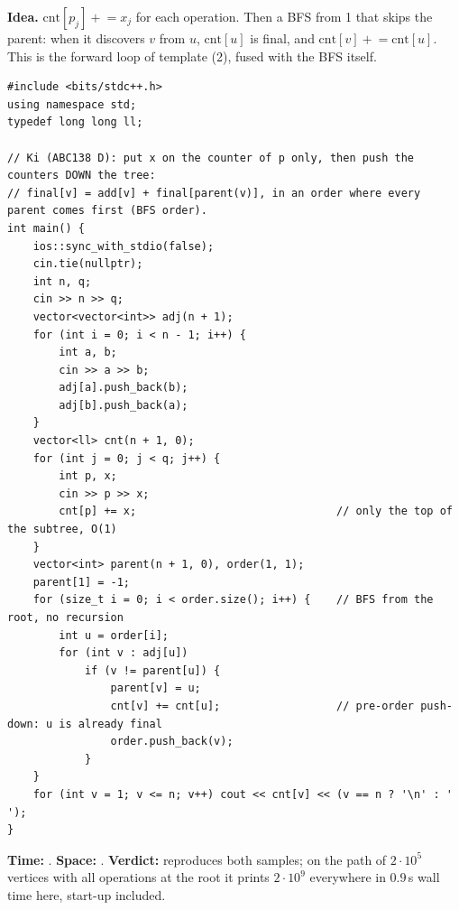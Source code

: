 \begin{algorithmbox}
\textbf{Idea.} $\mathrm{cnt}[p_j] \mathrel{+}= x_j$ for each operation. Then a BFS from 1 that skips the parent: when it discovers $v$ from $u$, $\mathrm{cnt}[u]$ is final, and $\mathrm{cnt}[v] \mathrel{+}= \mathrm{cnt}[u]$. This is the forward loop of template (2), fused with the BFS itself.

\begin{lstlisting}[style=cpp]
#include <bits/stdc++.h>
using namespace std;
typedef long long ll;

// Ki (ABC138 D): put x on the counter of p only, then push the counters DOWN the tree:
// final[v] = add[v] + final[parent(v)], in an order where every parent comes first (BFS order).
int main() {
    ios::sync_with_stdio(false);
    cin.tie(nullptr);
    int n, q;
    cin >> n >> q;
    vector<vector<int>> adj(n + 1);
    for (int i = 0; i < n - 1; i++) {
        int a, b;
        cin >> a >> b;
        adj[a].push_back(b);
        adj[b].push_back(a);
    }
    vector<ll> cnt(n + 1, 0);
    for (int j = 0; j < q; j++) {
        int p, x;
        cin >> p >> x;
        cnt[p] += x;                               // only the top of the subtree, O(1)
    }
    vector<int> parent(n + 1, 0), order(1, 1);
    parent[1] = -1;
    for (size_t i = 0; i < order.size(); i++) {    // BFS from the root, no recursion
        int u = order[i];
        for (int v : adj[u])
            if (v != parent[u]) {
                parent[v] = u;
                cnt[v] += cnt[u];                  // pre-order push-down: u is already final
                order.push_back(v);
            }
    }
    for (int v = 1; v <= n; v++) cout << cnt[v] << (v == n ? '\n' : ' ');
}
\end{lstlisting}

\begin{complexitybox}
\textbf{Time:} . \textbf{Space:} . \textbf{Verdict:} reproduces both samples; on the path of $2\cdot10^5$ vertices with all operations at the root it prints $2\cdot10^9$ everywhere in $0.9$\,s wall time here, start-up included.
\end{complexitybox}
\end{algorithmbox}

